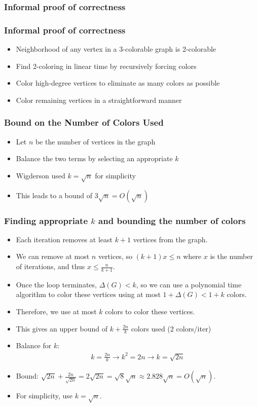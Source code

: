\documentclass{beamer}
\begin{document}
\subsubsection{Informal proof of correctness}
\begin{frame}
\frametitle{Informal proof of correctness}
\begin{itemize}
    \item Neighborhood of any vertex in a 3-colorable graph is 2-colorable
    \item Find 2-coloring in linear time by recursively forcing colors
    \item Color high-degree vertices to eliminate as many colors as possible
    \item Color remaining vertices in a straightforward manner
\end{itemize}
\end{frame}

\begin{frame}
\frametitle{Bound on the Number of Colors Used}
\begin{itemize}
    \item Let \(n\) be the number of vertices in the graph
    \item Balance the two terms by selecting an appropriate \(k\)
    \item Wigderson used \(k = \sqrt{n}\) for simplicity
    \item This leads to a bound of \(3\sqrt{n} = O(\sqrt{n})\)
\end{itemize}
\end{frame}

\begin{frame}
\frametitle{Finding appropriate $k$ and bounding the number of colors}
\begin{itemize}
    \item Each iteration removes at least $k + 1$ vertices from the graph.
    \item We can remove at most $n$ vertices, so $(k+1)x \leq n$ where $x$ is the number of iterations, and thus $x \leq \frac{n}{k+1}$.
    \item Once the loop terminates, $\Delta(G) < k$, so we can use a polynomial time algorithm to color these vertices using at most $1 + \Delta(G) < 1 + k$ colors.
    \item Therefore, we use at most $k$ colors to color these vertices.
    \item This gives an upper bound of $k + \frac{2n}{k}$ colors used
      (2 colors/iter)
    \item Balance for $k$:
    \begin{align*}
        k = \frac{2n}{k} \longrightarrow k^2 = 2n \longrightarrow k = \sqrt{2n}
    \end{align*}
    \item Bound:  $\sqrt{2n} + \frac{2n}{\sqrt{2n}} = 2\sqrt{2n} = \sqrt{8}\sqrt{n} \approx 2.828\sqrt{n} = O(\sqrt{n})$.
    \item For simplicity, use $k = \sqrt{n}$.
\end{itemize}
\end{frame}
\end{document}
